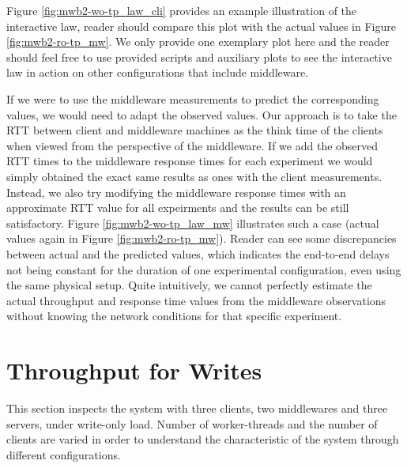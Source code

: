 \documentclass[11pt,a4paper]{article}
\begin{document}
\par Figure \ref{fig:mwb2-wo-tp_law_cli} provides an example illustration of the interactive law, reader should compare this plot with the actual values in Figure \ref{fig:mwb2-ro-tp_mw}. We only provide one exemplary plot here and the reader should feel free to use provided scripts and auxiliary plots to see the interactive law in action on other configurations that include middleware.
\par If we were to use the middleware measurements to predict the corresponding values, we would need to adapt the observed values. Our approach is to take the RTT between client and middleware machines as the think time of the clients when viewed from the perspective of the middleware. If we add the observed RTT times to the middleware response times for each experiment we would simply obtained the exact same results as ones with the client measurements. Instead, we also try modifying the middleware response times with an approximate RTT value for all expeirments and the results can be still satisfactory. Figure \ref{fig:mwb2-wo-tp_law_mw} illustrates such a case (actual values again in Figure \ref{fig:mwb2-ro-tp_mw}). Reader can see some discrepancies between actual and the predicted values, which indicates the end-to-end delays not being constant for the duration of one experimental configuration, even using the same physical setup. Quite intuitively, we cannot perfectly estimate the actual throughput and response time values from the middleware observations without knowing the network conditions for that specific experiment.

\section{Throughput for Writes} \label{sec:tpfw}
This section inspects the system with three clients, two middlewares and three servers, under write-only load. Number of worker-threads and the number of clients are varied in order to understand the characteristic of the system through different configurations.
\end{document}
